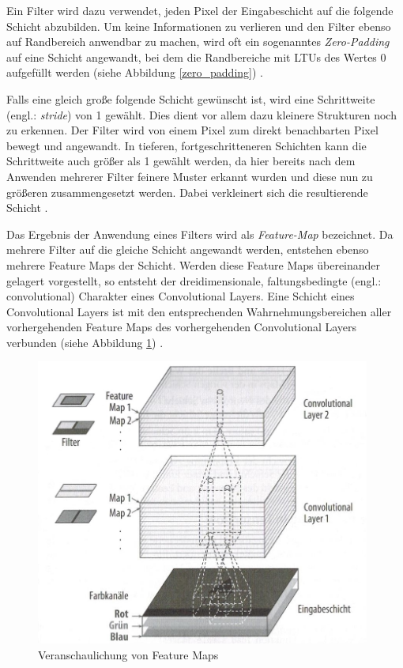 Ein Filter wird dazu verwendet, jeden Pixel der Eingabeschicht auf die folgende Schicht abzubilden. Um keine Informationen zu verlieren und den Filter ebenso auf Randbereich anwendbar zu machen, wird oft ein sogenanntes \textit{Zero-Padding} auf eine Schicht angewandt, bei dem die Randbereiche mit LTUs des Wertes 0 aufgefüllt werden (siehe Abbildung \ref{zero_padding}) \cite{AurelienGeron.2018}.

Falls eine gleich große folgende Schicht gewünscht ist, wird eine Schrittweite (engl.: \textit{stride}) von 1 gewählt. Dies dient vor allem dazu kleinere Strukturen noch zu erkennen. Der Filter wird von einem Pixel zum direkt benachbarten Pixel bewegt und angewandt. In tieferen, fortgeschritteneren Schichten kann die Schrittweite auch größer als 1 gewählt werden, da hier bereits nach dem Anwenden mehrerer Filter feinere Muster erkannt wurden und diese nun zu größeren zusammengesetzt werden. Dabei verkleinert sich die resultierende Schicht \cite{AurelienGeron.2018}.

Das Ergebnis der Anwendung eines Filters wird als \textit{Feature-Map} bezeichnet. Da mehrere Filter auf die gleiche Schicht angewandt werden, entstehen ebenso mehrere Feature Maps der Schicht. Werden diese Feature Maps übereinander gelagert vorgestellt, so entsteht der dreidimensionale, \glqq faltungsbedingte\grqq{} (engl.: convolutional) Charakter eines Convolutional Layers. Eine Schicht eines Convolutional Layers ist mit den entsprechenden Wahrnehmungsbereichen aller vorhergehenden Feature Maps des vorhergehenden Convolutional Layers verbunden (siehe Abbildung \ref{feature_maps}) \cite{AurelienGeron.2018}.

\begin{figure}[ht]
	\begin{center}
		\includegraphics[width=11cm]{Bilder/feature_maps.jpeg} 
		\caption[Veranschaulichung von Feature Maps]{Veranschaulichung von Feature Maps \cite{AurelienGeron.2018}}
		\label{feature_maps}
	\end{center}
\end{figure}


